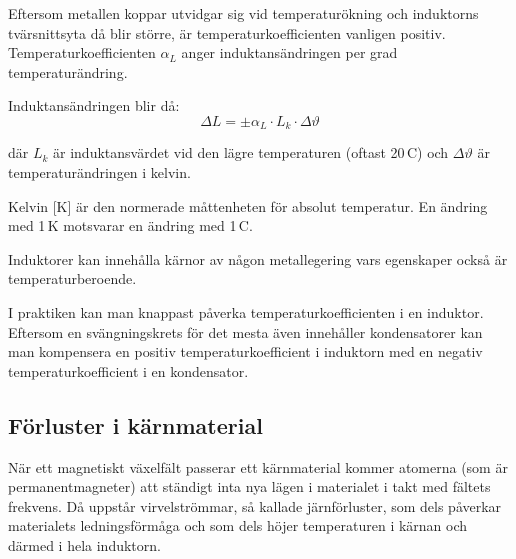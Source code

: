 Eftersom metallen koppar utvidgar sig vid temperaturökning och induktorns
tvärsnittsyta då blir större, är temperaturkoefficienten vanligen positiv.
Temperaturkoefficienten \(\alpha_L\) anger induktansändringen per grad
temperaturändring.

Induktansändringen blir då:
\[\Delta L = \pm \alpha _L \cdot L_k \cdot \Delta\vartheta\]

där \(L_k\) är induktansvärdet vid den lägre temperaturen (oftast 20\degree\,C)
och \(\Delta\vartheta\) är temperaturändringen i kelvin.

Kelvin [K] är den normerade måttenheten för absolut temperatur. En ändring med
1\,K motsvarar en ändring med 1\degree\,C.

Induktorer kan innehålla kärnor av någon metallegering vars egenskaper också är
temperaturberoende.

I praktiken kan man knappast påverka temperaturkoefficienten i en induktor.
Eftersom en svängningskrets för det mesta även innehåller kondensatorer kan man
kompensera en positiv temperaturkoefficient i induktorn med en negativ
temperaturkoefficient i en kondensator.

\subsection{Förluster i kärnmaterial}

När ett magnetiskt växelfält passerar ett kärnmaterial kommer atomerna (som är
permanentmagneter) att ständigt inta nya lägen i materialet i takt med fältets
frekvens. Då uppstår virvelströmmar, så kallade järnförluster, som dels påverkar
materialets ledningsförmåga och som dels höjer temperaturen i kärnan och därmed
i hela induktorn.
